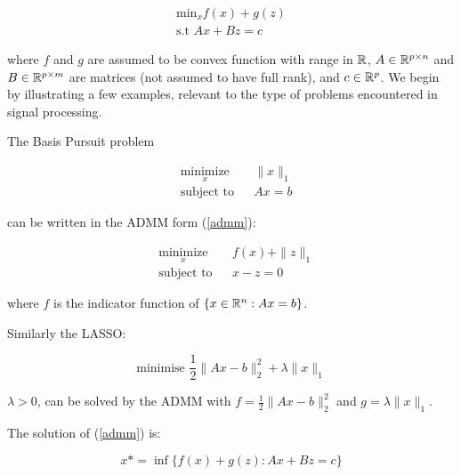 \documentclass{article}
\begin{document}
\begin{align}
\text{min}_{x} f\left( x \right) + g\left(z\right)
\\
\text{s.t } Ax +Bz = c
\label{admm}
\end{align}

where \(f\) and \(g\) are assumed to be convex function with range in \({\mathbb{R}}\), \(A \in {\mathbb{R}}^{p \times n}\) and \(B\in {\mathbb{R}}^{p \times m}\) are matrices (not assumed to have full rank), and \(c \in {\mathbb{R}}^p\). We begin by illustrating a few examples, relevant to the type of problems encountered in signal processing.

\begin{example}
The Basis Pursuit problem

\begin{equation*}
\begin{aligned}
& \underset{x}{\text{minimize}}
& & \|x\|_1 \\
& \text{subject to}
& & Ax = b
\label{bp}
\end{aligned}
\end{equation*}

can be written in the ADMM form (\ref{admm}):

\begin{equation*}
\begin{aligned}
& \underset{x}{\text{minimize}}
& & f\left( x \right) + \|z\|_1 \\
& \text{subject to}
& & x - z = 0
\label{bp_reform}
\end{aligned}
\end{equation*}

where \(f\) is the indicator function of \(\{x\in {\mathbb{R}}^n : Ax = b\}\). 

\end{example} 

\begin{example}
Similarly the LASSO:

\begin{equation}
\text{minimise } \frac{1}{2}\|Ax-b\|_2^2 + \lambda\|x\|_1
\end{equation}

\(\lambda > 0\), can be solved by the ADMM with \(f = \frac{1}{2}\|Ax-b\|_2^2\) and \(g = \lambda\|x\|_1\).

\end{example}

The solution of (\ref{admm}) is:

\begin{equation}
x* = \inf\{f\left( x \right) + g\left(z\right) : Ax +Bz = c\}
\end{equation}
\end{document}
